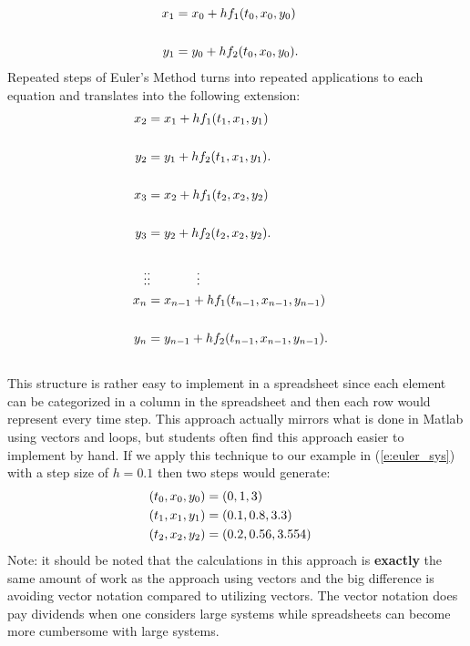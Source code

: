 \documentclass[twoside]{article}
\begin{document}
\begin{eqnarray*}
x_1 &= x_0 + hf_1(t_0,x_0,y_0) \cr \cr
y_1 & = y_0 + hf_2(t_0,x_0,y_0).
\end{eqnarray*}
Repeated steps of Euler's Method turns into repeated applications to each equation and translates into the following extension:
\begin{eqnarray*}
x_2 &= x_1 + hf_1(t_1,x_1,y_1) \cr \cr
y_2 & = y_1 + hf_2(t_1,x_1,y_1). \cr \cr
x_3 &= x_2 + hf_1(t_2,x_2,y_2) \cr \cr
y_3 & = y_2 + hf_2(t_2,x_2,y_2). \cr \cr
\vdots & \vdots \hspace{0.5in} \vdots \cr
x_n &= x_{n-1} + hf_1(t_{n-1},x_{n-1},y_{n-1}) \cr \cr
y_n & = y_{n-1} + hf_2(t_{n-1},x_{n-1},y_{n-1}). \cr \cr
\end{eqnarray*}
This structure is rather easy to implement in a spreadsheet since each element can be categorized in a column in the spreadsheet and then each row would represent every time step. This approach actually mirrors what is done in Matlab using vectors and loops, but students often find this approach easier to implement by hand. If we apply this technique to our example in (\ref{e:euler_sys}) with a step size of $h=0.1$ then two steps would generate:
\begin{eqnarray*}
(t_0,x_0,y_0) &= (0,1,3) \cr 
(t_1,x_1,y_1) &= (0.1,0.8,3.3) \cr 
(t_2,x_2,y_2) &= (0.2,0.56,3.554) \cr 
\end{eqnarray*}
Note: {\color{teal} it should be noted that the calculations in this approach is {\bf exactly} the same amount of work as the approach using vectors and the big difference is avoiding vector notation compared to utilizing vectors. The vector notation does pay dividends when one considers large systems while spreadsheets can become more cumbersome with large systems. }
\end{document}
